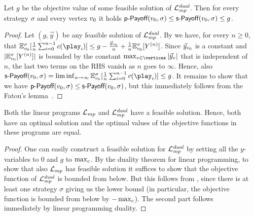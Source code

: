 \begin{corollary}
\label{5-cor:mp-value-bound}
Let $g$ be the objective value of some feasible solution of $\mathcal{L}_{\mathit{mp}}^{\mathit{dual}}$. Then for every strategy $\sigma$ and every vertex $v_0$ it holds $\textsf{p-Payoff}(v_0,\sigma) \leq \textsf{s-Payoff}(v_0,\sigma) \leq g$.
\end{corollary}
\begin{proof}
Let $ ({g}, \vec{y})$ be any feasible solution of $\mathcal{L}_{\mathit{mp}}^{\mathit{dual}}$.
By  we have, for every $n\geq 0$, that $\expv^\sigma_{\vinit}[\frac{1}{n}\sum_{i=0}^{n-1}\colouring(\play_i)]\leq g - \frac{ \vec{y}_{\vinit}}{n}+ \frac{1}{n}\expv^\sigma_{\vinit} [Y^{(n)}]$. Since $ \vec{y}_{v_0}$ is a constant and $|\mathbb{E}^\sigma_{v_0} [Y^{(n)}]|$ is bounded by the constant $ \max_{v\in \vertices}|\vec{y}_v|$ that is independent of $n$, the last two terms on the RHS vanish as $n$ goes to $\infty$. Hence, also $\stepPay(\vinit,\sigma) = \liminf_{n\rightarrow \infty} \expv^\sigma_{\vinit}[\frac{1}{n}\sum_{i=0}^{n-1}\colouring(\play_i)] \leq g$. It remains to show that we have $\textsf{p-Payoff}(v_0,\sigma) \leq \textsf{s-Payoff}(v_0,\sigma)$, but this immediately follows from the Fatou's lemma~\cite[Theorem 1.6.8]{Ash&Doleans-Dade:2000}.
\end{proof}

\begin{corollary}
\label{5-cor:lpmp-optimal-exists}
Both the linear programs $\mathcal{L}_{\mathit{mp}}$ and $\mathcal{L}_{\mathit{mp}}^{\mathit{dual}}$ have a feasible solution. Hence, both have an optimal solution and the optimal values of the objective functions in these programs are equal.
\end{corollary}
\begin{proof}
One can easily construct a feasible solution for $\mathcal{L}_{\mathit{mp}}^{\mathit{dual}}$ by setting all the $y$-variables to $0$ and $g$ to $\max_{c}$. By the duality theorem for linear programming, to show that also $\mathcal{L}_{\mathit{mp}}$ has feasible solution it suffices to show that the objective function of $\mathcal{L}_{\mathit{mp}}^{\mathit{dual}}$ is bounded from below. But this follows from , since there is at least one strategy $\sigma$ giving us the lower bound (in particular, the objective function is bounded from below by $-\max_{c}$). The second part follows immediately by linear programming duality.
\end{proof}



